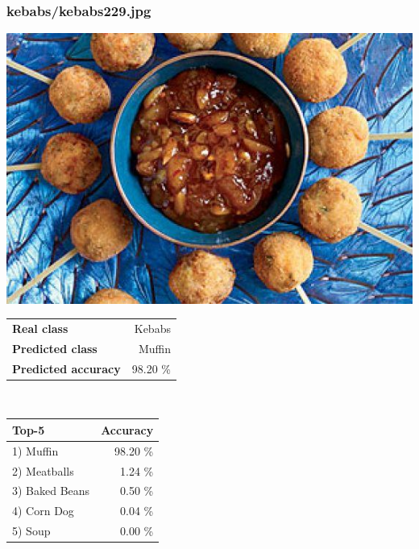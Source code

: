 \subsubsection{kebabs/kebabs229.jpg}

\begin{minipage}[t]{0.4\textwidth}
	\vspace{0pt}
	\includegraphics[width=\linewidth]{images/evaluation-images/kebabs/kebabs229.jpg}
\end{minipage}
\hfill
\begin{minipage}[t]{0.5\textwidth}
	\vspace{0pt}\raggedright
	\begin{tabularx}{\textwidth}{X r}
		\small \textbf{Real class} & \small Kebabs\\
		\small \textbf{Predicted class} & \small Muffin\\
		\small \textbf{Predicted accuracy} & \small 98.20 \%
    \end{tabularx}\\
    
    \vspace{6pt}
	\begin{tabularx}{\textwidth}{X r}
        \small \textbf{Top-5} & \small \textbf{Accuracy} \\
        \hline
		\small 1) Muffin & \small 98.20 \%\\\small 2) Meatballs & \small 1.24 \%\\\small 3) Baked Beans & \small 0.50 \%\\\small 4) Corn Dog & \small 0.04 \%\\\small 5) Soup & \small 0.00 \%
    \end{tabularx}
\end{minipage}
    
